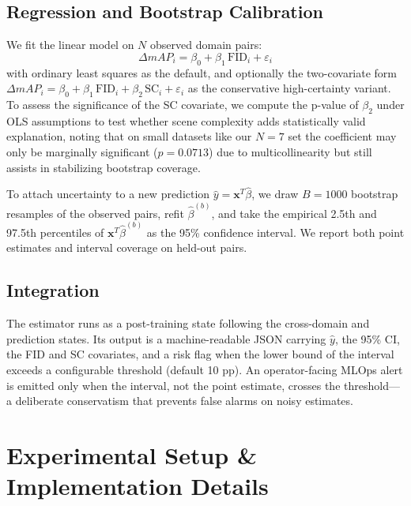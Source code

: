 \documentclass[10pt,twocolumn,letterpaper]{article}
\begin{document}
\subsection{Regression and Bootstrap Calibration}
We fit the linear model on $N$ observed domain pairs:
\begin{equation}
    \Delta mAP_i = \beta_0 + \beta_1\,\text{FID}_i + \varepsilon_i
\end{equation}
with ordinary least squares as the default, and optionally the two-covariate form $\Delta mAP_i = \beta_0 + \beta_1\,\text{FID}_i + \beta_2\,\text{SC}_i + \varepsilon_i$ as the conservative high-certainty variant. To assess the significance of the SC covariate, we compute the p-value of $\beta_2$ under OLS assumptions to test whether scene complexity adds statistically valid explanation, noting that on small datasets like our $N=7$ set the coefficient may only be marginally significant ($p=0.0713$) due to multicollinearity but still assists in stabilizing bootstrap coverage.

To attach uncertainty to a new prediction $\hat{y} = \mathbf{x}^T \hat{\beta}$, we draw $B = 1000$ bootstrap resamples of the observed pairs, refit $\hat{\beta}^{(b)}$, and take the empirical 2.5th and 97.5th percentiles of $\mathbf{x}^T \hat{\beta}^{(b)}$ as the 95\% confidence interval. We report both point estimates and interval coverage on held-out pairs.

\subsection{Integration}
The estimator runs as a post-training state following the cross-domain and prediction states. Its output is a machine-readable JSON carrying $\hat{y}$, the 95\% CI, the FID and SC covariates, and a risk flag when the lower bound of the interval exceeds a configurable threshold (default 10 pp). An operator-facing MLOps alert is emitted only when the interval, not the point estimate, crosses the threshold---a deliberate conservatism that prevents false alarms on noisy estimates.

\section{Experimental Setup \& Implementation Details}
\end{document}
